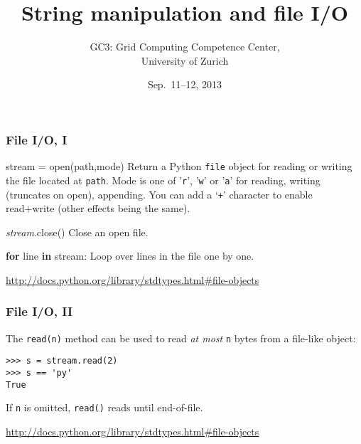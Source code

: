 \documentclass[english,serif,mathserif,xcolor=pdftex,dvipsnames,table]{beamer}
\title[Part 4]{%
  String manipulation and file I/O
}
\author[GC3]{%
  GC3: Grid Computing Competence Center, \\
  University of Zurich
}
\date{Sep.~11--12, 2013}
\begin{document}
\maketitle

\begin{frame}[fragile]
  \frametitle{File I/O, I}

  \begin{describe}{\ttfamily stream = open(path,mode)}
    Return a Python \texttt{file} object for reading or writing the
    file located at \texttt{path}.  Mode is one of '\texttt{r}',
    '\texttt{w}' or '\texttt{a}' for reading, writing (truncates on open), appending.
    You can add a `\texttt{+}' character to enable read+write (other
    effects being the same).
  \end{describe}

  \begin{describe}{\ttfamily \emph{stream}.close()}
    Close an open file.
  \end{describe}

  \begin{describe}{\ttfamily \textbf{for} line \textbf{in} stream:}
    Loop over lines in the file one by one.
  \end{describe}

  \begin{references}
    \url{http://docs.python.org/library/stdtypes.html#file-objects}
  \end{references}
\end{frame}


\begin{frame}[fragile]
  \frametitle{File I/O, II}

  The \lstinline|read(n)| method can be used to read \emph{at most}
  \lstinline|n| bytes from a file-like object:
\begin{lstlisting}
>>> s = stream.read(2)
>>> s == 'py'
True
\end{lstlisting}
  If \lstinline|n| is omitted, \texttt{read()} reads until end-of-file.

  \begin{references}
    \url{http://docs.python.org/library/stdtypes.html#file-objects}
  \end{references}
\end{frame}
\end{document}
